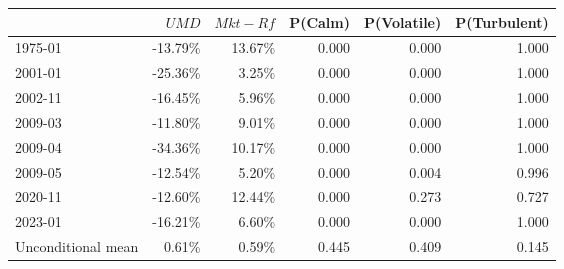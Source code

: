 \begin{tabular}{lrrrrr}
\toprule
 & $UMD$ & $Mkt-Rf$ & P(Calm) & P(Volatile) & P(Turbulent) \\
\midrule
1975-01 & -13.79\% & 13.67\% & 0.000 & 0.000 & 1.000 \\
2001-01 & -25.36\% & 3.25\% & 0.000 & 0.000 & 1.000 \\
2002-11 & -16.45\% & 5.96\% & 0.000 & 0.000 & 1.000 \\
2009-03 & -11.80\% & 9.01\% & 0.000 & 0.000 & 1.000 \\
2009-04 & -34.36\% & 10.17\% & 0.000 & 0.000 & 1.000 \\
2009-05 & -12.54\% & 5.20\% & 0.000 & 0.004 & 0.996 \\
2020-11 & -12.60\% & 12.44\% & 0.000 & 0.273 & 0.727 \\
2023-01 & -16.21\% & 6.60\% & 0.000 & 0.000 & 1.000 \\
Unconditional mean & 0.61\% & 0.59\% & 0.445 & 0.409 & 0.145 \\
\bottomrule
\end{tabular}

